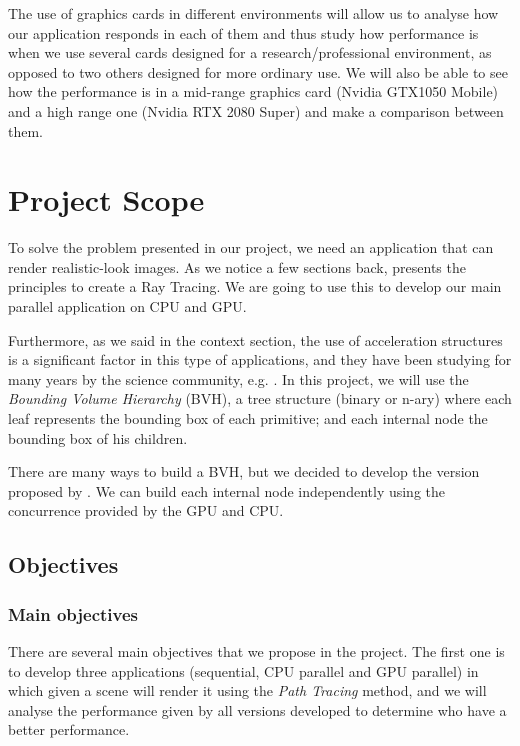 \documentclass[titlepage,12pt]{report}
\begin{document}
The use of graphics cards in different environments will allow us to analyse how our application responds in each of them and thus study how performance is when we use several cards designed for a research/professional environment, as opposed to two others designed for more ordinary use. We will also be able to see how the performance is in a mid-range graphics card (Nvidia GTX1050 Mobile) and a high range one (Nvidia RTX 2080 Super) and make a comparison between them.

\section{Project Scope}

To solve the problem presented in our project, we need an application that can render realistic-look images. As we notice a few sections back, \citep{ShirleyRTA, ShirleyRTB, ShirleyRTC} presents the principles to create a Ray Tracing. We are going to use this to develop our main parallel application on CPU and GPU.

Furthermore, as we said in the context section, the use of acceleration structures is a significant factor in this type of applications, and they have been studying for many years by the science community, e.g. \citep{Rubin1980}. In this project, we will use the \textit{
Bounding Volume Hierarchy} (BVH), a tree structure (binary or n-ary) where each leaf represents the bounding box of each primitive; and each internal node the bounding box of his children.

There are many ways to build a BVH, but we decided to develop the version proposed by \citep{Karras2012, Karras2013}. We can build each internal node independently using the concurrence provided by the GPU and CPU.

\subsection{Objectives}

\subsubsection{Main objectives}

There are several main objectives that we propose in the project. The first one is to develop three applications (sequential, CPU parallel and GPU parallel) in which given a scene will render it using the \textit{Path Tracing} method, and we will analyse the performance given by all versions developed to determine who have a better performance.
\end{document}
